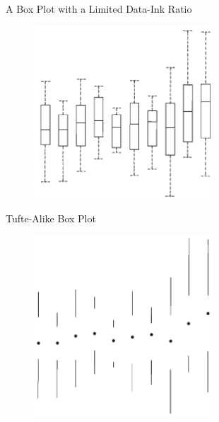 \documentclass[notes, aspectratio=1610]{beamer}
\begin{document}
\begin{frame}{A Box Plot with a Limited Data-Ink Ratio}{}
	\begin{figure}
		\begin{center}
			\includegraphics[width=0.6\textwidth]{images/trad_boxplot.png}
		\end{center}
	\end{figure}
\end{frame}

\begin{frame}{Tufte-Alike Box Plot}{}
\begin{figure}
		\begin{center}
			\includegraphics[width=0.6\textwidth]{images/tufte_boxplot.png}
		\end{center}
	\end{figure}

\end{frame}
\end{document}
